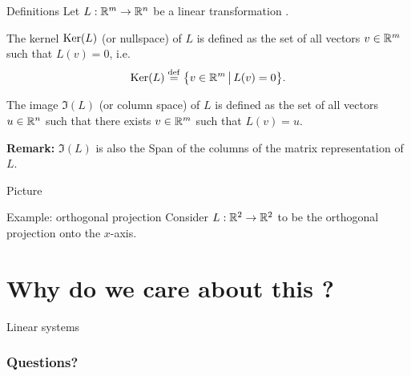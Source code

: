 \documentclass{beamer}
\begin{document}
\begin{frame}[t]{Definitions}
	Let \quad $L: \mathbb{R}^m \to \mathbb{R}^n$ \quad be a linear transformation .
	\begin{definition}[Kernel]
		The kernel ${{\rm Ker}}(L)$ (or nullspace) of $L$ is defined as the set of all vectors $v \in \mathbb{R}^m$ such that $L(v) = 0$, i.e.
		$$
		{{\rm Ker}}(L) \overset{\rm def}{=} \big\{ v \in \mathbb{R}^m \, \big| \, L(v) = 0 \big\}.
		$$
	\end{definition}

	\begin{definition}[Image]
		The image $\Im(L)$ (or column space) of $L$ is defined as the set of all vectors $u \in \mathbb{R}^n$ such that there exists $v \in \mathbb{R}^m$ such that $L(v) = u$. 
	\end{definition}
	\textbf{Remark:} $\Im(L)$ is also the Span of the columns of the matrix representation of $L$.
\end{frame}



\begin{frame}{Picture}
\end{frame}


\begin{frame}[t]{Example: orthogonal projection}
	Consider \quad $L: \mathbb{R}^2 \to \mathbb{R}^2$ \quad to be the orthogonal projection onto the $x$-axis.
\end{frame}


\section{Why do we care about this ?}

\begin{frame}[t]{Linear systems}


\end{frame}

\appendix
\backupbegin
\begin{frame}
	\frametitle{Questions?}
\end{frame}
\backupend
\end{document}
